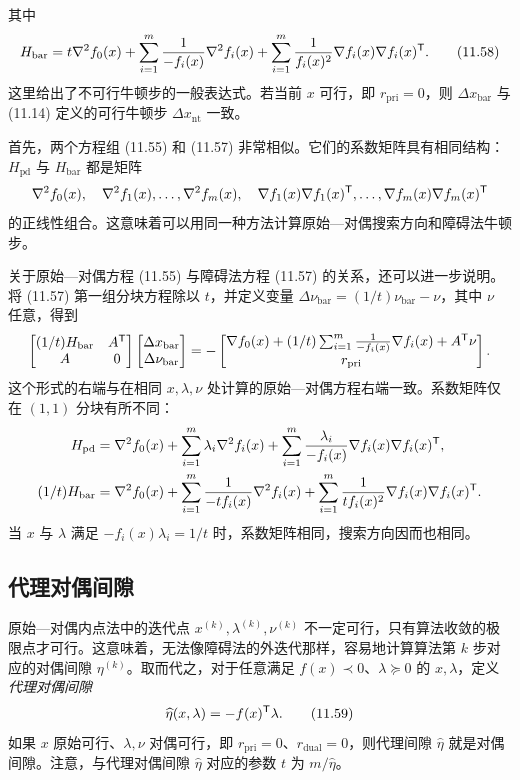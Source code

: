 其中
\begin{equation}
H_{\mathrm{bar}}=t\nabla^2 f_0(x)+\sum_{i=1}^m\frac1{-f_i(x)}\nabla^2 f_i(x)
+\sum_{i=1}^m\frac1{f_i(x)^2}\nabla f_i(x)\nabla f_i(x)^\mathsf T.\tag{11.58}
\end{equation}
这里给出了不可行牛顿步的一般表达式。若当前 $x$ 可行，即 $r_{\mathrm{pri}}=0$，则 $\Delta x_{\mathrm{bar}}$ 与 (11.14) 定义的可行牛顿步 $\Delta x_{\mathrm{nt}}$ 一致。

首先，两个方程组 (11.55) 和 (11.57) 非常相似。它们的系数矩阵具有相同结构：$H_{\mathrm{pd}}$ 与 $H_{\mathrm{bar}}$ 都是矩阵
\[
\nabla^2 f_0(x),\quad\nabla^2 f_1(x),\ldots,\nabla^2 f_m(x),\quad
\nabla f_1(x)\nabla f_1(x)^\mathsf T,\ldots,\nabla f_m(x)\nabla f_m(x)^\mathsf T
\]
的正线性组合。这意味着可以用同一种方法计算原始—对偶搜索方向和障碍法牛顿步。

关于原始—对偶方程 (11.55) 与障碍法方程 (11.57) 的关系，还可以进一步说明。将 (11.57) 第一组分块方程除以 $t$，并定义变量 $\Delta\nu_{\mathrm{bar}}=(1/t)\nu_{\mathrm{bar}}-\nu$，其中 $\nu$ 任意，得到
\[
\begin{bmatrix}(1/t)H_{\mathrm{bar}}&A^\mathsf T\\A&0\end{bmatrix}
\begin{bmatrix}\Delta x_{\mathrm{bar}}\\\Delta\nu_{\mathrm{bar}}\end{bmatrix}
=-\begin{bmatrix}\nabla f_0(x)+(1/t)\sum_{i=1}^m\frac1{-f_i(x)}\nabla f_i(x)+A^\mathsf T\nu\\r_{\mathrm{pri}}\end{bmatrix}.
\]
这个形式的右端与在相同 $x,\lambda,\nu$ 处计算的原始—对偶方程右端一致。系数矩阵仅在 $(1,1)$ 分块有所不同：
\begin{align*}
H_{\mathrm{pd}}&=\nabla^2 f_0(x)+\sum_{i=1}^m\lambda_i\nabla^2 f_i(x)
+\sum_{i=1}^m\frac{\lambda_i}{-f_i(x)}\nabla f_i(x)\nabla f_i(x)^\mathsf T,\\
(1/t)H_{\mathrm{bar}}&=\nabla^2 f_0(x)+\sum_{i=1}^m\frac1{-tf_i(x)}\nabla^2 f_i(x)
+\sum_{i=1}^m\frac1{tf_i(x)^2}\nabla f_i(x)\nabla f_i(x)^\mathsf T.
\end{align*}
当 $x$ 与 $\lambda$ 满足 $-f_i(x)\lambda_i=1/t$ 时，系数矩阵相同，搜索方向因而也相同。

\subsection{代理对偶间隙}
原始—对偶内点法中的迭代点 $x^{(k)},\lambda^{(k)},\nu^{(k)}$ 不一定可行，只有算法收敛的极限点才可行。这意味着，无法像障碍法的外迭代那样，容易地计算算法第 $k$ 步对应的对偶间隙 $\eta^{(k)}$。取而代之，对于任意满足 $f(x)\prec0$、$\lambda\succeq0$ 的 $x,\lambda$，定义\emph{代理对偶间隙}
\begin{equation}
\widehat\eta(x,\lambda)=-f(x)^\mathsf T\lambda.\tag{11.59}
\end{equation}
如果 $x$ 原始可行、$\lambda,\nu$ 对偶可行，即 $r_{\mathrm{pri}}=0$、$r_{\mathrm{dual}}=0$，则代理间隙 $\widehat\eta$ 就是对偶间隙。注意，与代理对偶间隙 $\widehat\eta$ 对应的参数 $t$ 为 $m/\widehat\eta$。

